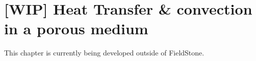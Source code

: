 
\chapter{[WIP] Heat Transfer \& convection in a porous medium} %

This chapter is currently being developed outside of FieldStone.







